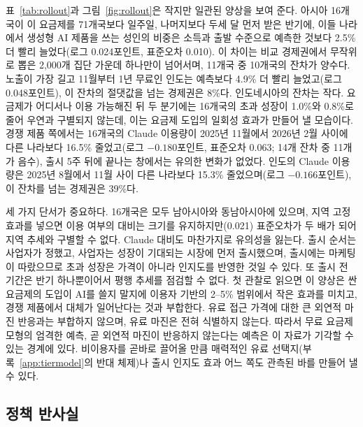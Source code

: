 \documentclass[11pt]{article}
\theoremstyle{definition}
\theoremstyle{remark}
\begin{document}
표~\ref{tab:rollout}과 그림~\ref{fig:rollout}은 작지만 일관된 양상을 보여 준다. 아시아 16개국이 이 요금제를 71개국보다 일주일, 나머지보다 두세 달 먼저 받은 반기에, 이들 나라에서 생성형 AI 제품을 쓰는 성인의 비중은 소득과 출발 수준으로 예측한 것보다 2.5\% 더 빨리 늘었다(로그 0.024포인트, 표준오차 0.010). 이 차이는 비교 경제권에서 무작위로 뽑은 2,000개 집단 가운데 하나만이 넘어서며, 11개국 중 10개국의 잔차가 양수다. 노출이 가장 길고 11월부터 1년 무료인 인도는 예측보다 4.9\% 더 빨리 늘었고(로그 0.048포인트), 이 잔차의 절댓값을 넘는 경제권은 8\%다. 인도네시아의 잔차는 작다. 요금제가 어디서나 이용 가능해진 뒤 두 분기에는 16개국의 초과 성장이 1.0\%와 0.8\%로 줄어 우연과 구별되지 않는데, 이는 요금제 도입의 일회성 효과가 만들어 낼 모습이다. 경쟁 제품 쪽에서는 16개국의 Claude 이용량이 2025년 11월에서 2026년 2월 사이에 다른 나라보다 16.5\% 줄었고(로그 $-0.180$포인트, 표준오차 0.063; 14개 잔차 중 11개가 음수), 출시 5주 뒤에 끝나는 창에서는 유의한 변화가 없었다. 인도의 Claude 이용량은 2025년 8월에서 11월 사이 다른 나라보다 15.3\% 줄었으며(로그 $-0.166$포인트), 이 잔차를 넘는 경제권은 39\%다.

세 가지 단서가 중요하다. 16개국은 모두 남아시아와 동남아시아에 있으며, 지역 고정효과를 넣으면 이용 여부의 대비는 크기를 유지하지만(0.021) 표준오차가 두 배가 되어 지역 추세와 구별할 수 없다. Claude 대비도 마찬가지로 유의성을 잃는다. 출시 순서는 사업자가 정했고, 사업자는 성장이 기대되는 시장에 먼저 출시했으며, 출시에는 마케팅이 따랐으므로 초과 성장은 가격이 아니라 인지도를 반영한 것일 수 있다. 또 출시 전 기간은 반기 하나뿐이어서 평행 추세를 점검할 수 없다. 첫 관찰로 읽으면 이 양상은 싼 요금제의 도입이 AI를 쓸지 말지에 이용자 기반의 2--5\% 범위에서 작은 효과를 미치고, 경쟁 제품에서 대체가 일어난다는 것과 부합한다. 유료 접근 가격에 대한 큰 외연적 마진 반응과는 부합하지 않으며, 유료 마진은 전혀 식별하지 않는다. 따라서 무료 요금제 모형의 엄격한 예측, 곧 외연적 마진이 반응하지 않는다는 예측은 이 자료가 기각할 수 있는 경계에 있다. 비이용자를 곧바로 끌어올 만큼 매력적인 유료 선택지(부록~\ref{app:tiermodel}의 반대 체제)나 출시 인지도 효과 어느 쪽도 관측된 바를 만들어 낼 수 있다.

\subsection{정책 반사실}\label{sec:policy}
\end{document}
